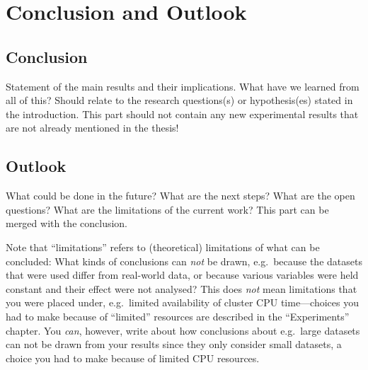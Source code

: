 \chapter{Conclusion and Outlook}\label{chap:conclusion}

\section{Conclusion}

Statement of the main results and their implications.
What have we learned from all of this?
Should relate to the research questions(s) or hypothesis(es) stated in the introduction.
This part should not contain any new experimental results that are not already mentioned in the thesis!

\section{Outlook}

What could be done in the future?
What are the next steps?
What are the open questions?
What are the limitations of the current work?
This part can be merged with the conclusion.

Note that ``limitations'' refers to (theoretical) limitations of what can be concluded:
What kinds of conclusions can \emph{not} be drawn, e.g.\ because the datasets that were used differ from real-world data, or because various variables were held constant and their effect were not analysed?
This does \emph{not} mean limitations that you were placed under, e.g.\ limited availability of cluster CPU time---choices you had to make because of ``limited'' resources are described in the ``Experiments'' chapter.
You \emph{can}, however, write about how conclusions about e.g.\ large datasets can not be drawn from your results since they only consider small datasets, a choice you had to make because of limited CPU resources.
